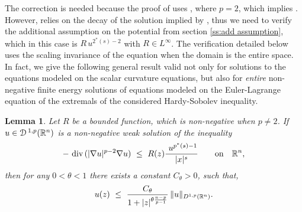 \documentclass[10pt]{amsart}
\newtheorem{lemma}[thrm]{Lemma}
\begin{document}
The correction is needed because the proof of \cite[Theorem 3.1]{V11} uses \cite[(3.2)]{V11}, where $p=2$, which implies \cite[(3.6)]{V11}. However, \cite[(3.2)]{V11} relies on the decay  of the solution implied by \cite[Theorem 2.10]{V11}, thus we need to verify the additional assumption on the potential from section \ref{ss:add assumption}, which in this case is $R\, u^{2^*(s)-2}$ with $R\in L^\infty$. The verification  detailed below uses the scaling invariance of the equation when the domain is the entire space. In fact, we give the following  general result valid not only for solutions to the equations modeled on the scalar curvature equations, but also for \emph{entire} non-negative finite energy solutions of equations modeled on the Euler-Lagrange equation of the extremals of the considered Hardy-Sobolev inequality.


\begin{lemma}\label{l:asympt HS}
Let  $R$ be a bounded function, which is non-negative when $p\not=2$. If $u\in {\mathcal{D}}\,^{1,p}(\mathbb{R}^n)$ is a  non-negative weak solution of the inequality
\begin{equation}\label{e:p-extremals}
 -\ \text{div}\, (|{\nabla}u|^{p-2}{\nabla}u)\ \leq \  R(z)\frac {\
u^{p^*(s)-1}}{|x|^s} \qquad \text{on} \quad \mathbb{R}^n,
 \end{equation}
then  for any $0<\theta<1$ there exists a constant
$C_\theta>0$, such that,
\begin{equation}\label{e:asymp_decay_Laplacian}
u(z)\ \leq \ \frac {C_\theta}{1+\lvert z \rvert^{\theta \frac{n-p}{p-1}}}\,
\lVert u\rVert_{D^{1,p}(\mathbb{R}^n)}.
\end{equation}
\end{lemma}
\end{document}
